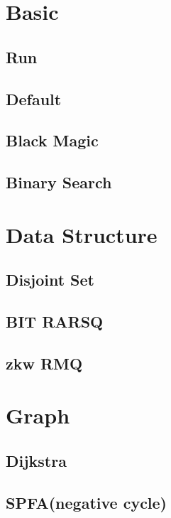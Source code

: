 \section{Basic}
    \subsection{Run}
        
    \subsection{Default}
        
    \subsection{Black Magic}
        
    \subsection{Binary Search}
        

\section{Data Structure}
    \subsection{Disjoint Set}
        
    \subsection{BIT RARSQ}
        
    \subsection{zkw RMQ}
        

\section{Graph}
    \subsection{Dijkstra}
        
    \subsection{SPFA(negative cycle)}
        
